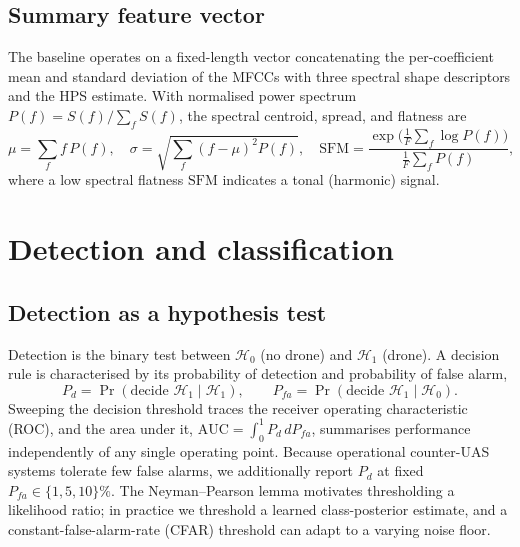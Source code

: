\documentclass[11pt]{article}
\begin{document}
\subsection{Summary feature vector}
The baseline operates on a fixed-length vector concatenating the per-coefficient
mean and standard deviation of the MFCCs with three spectral shape descriptors
and the HPS estimate. With normalised power spectrum $P(f)=S(f)/\sum_f S(f)$, the
spectral centroid, spread, and flatness are
\begin{equation}
\mu = \sum_f f\,P(f),\quad
\sigma = \sqrt{\sum_f (f-\mu)^2 P(f)},\quad
\mathrm{SFM} = \frac{\exp\!\big(\frac{1}{F}\sum_f \log P(f)\big)}
{\frac{1}{F}\sum_f P(f)},
\end{equation}
where a low spectral flatness $\mathrm{SFM}$ indicates a tonal (harmonic) signal.

\section{Detection and classification}
\label{sec:detection}
\subsection{Detection as a hypothesis test}
Detection is the binary test between $\mathcal{H}_0$ (no drone) and
$\mathcal{H}_1$ (drone). A decision rule is characterised by its probability of
detection and probability of false alarm,
\begin{equation}
P_d = \Pr(\text{decide }\mathcal{H}_1\mid\mathcal{H}_1),\qquad
P_{fa} = \Pr(\text{decide }\mathcal{H}_1\mid\mathcal{H}_0).
\end{equation}
Sweeping the decision threshold traces the receiver operating characteristic
(ROC), and the area under it,
$\mathrm{AUC}=\int_0^1 P_d\,dP_{fa}$, summarises performance independently of any
single operating point. Because operational counter-UAS systems tolerate few
false alarms, we additionally report $P_d$ at fixed $P_{fa}\in\{1,5,10\}\%$. The
Neyman--Pearson lemma motivates thresholding a likelihood ratio; in practice we
threshold a learned class-posterior estimate, and a constant-false-alarm-rate
(CFAR) threshold can adapt to a varying noise floor.
\end{document}
